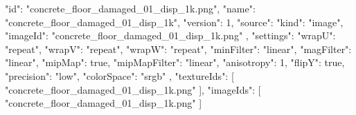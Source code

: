 {
  "id": "concrete_floor_damaged_01_disp_1k.png",
  "name": "concrete_floor_damaged_01_disp_1k",
  "version": 1,
  "source": {
    "kind": "image",
    "imageId": "concrete_floor_damaged_01_disp_1k.png"
  },
  "settings": {
    "wrapU": "repeat",
    "wrapV": "repeat",
    "wrapW": "repeat",
    "minFilter": "linear",
    "magFilter": "linear",
    "mipMap": true,
    "mipMapFilter": "linear",
    "anisotropy": 1,
    "flipY": true,
    "precision": "low",
    "colorSpace": "srgb"
  },
  "textureIds": [
    "concrete_floor_damaged_01_disp_1k.png"
  ],
  "imageIds": [
    "concrete_floor_damaged_01_disp_1k.png"
  ]
}
